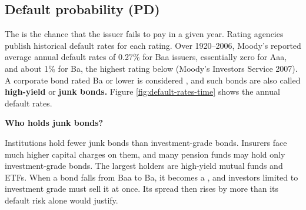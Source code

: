 \subsection{Default probability (PD)}

The  is the chance that the issuer fails to pay in a given year. Rating agencies publish historical default rates for each rating. Over 1920--2006, Moody's reported average annual default rates of 0.27\% 
for Baa issuers, essentially zero for Aaa, and about 1\% for Ba, 
the highest rating below  (Moody's Investors Service 2007). A corporate bond rated Ba or lower is considered , and such bonds are also called \textbf{high-yield} or \textbf{junk bonds.} Figure \ref{fig:default-rates-time} shows the annual default rates.

\begin{callout}{\textbf{Who holds junk bonds?}}

Institutions hold fewer junk bonds than investment-grade bonds. Insurers face much higher capital charges on them, and many pension funds may hold only investment-grade bonds. The largest holders are high-yield mutual funds and ETFs. When a bond falls from Baa to Ba, it becomes a , and investors limited to investment grade must sell it at once. Its spread then rises by more than its default risk alone would justify.
\end{callout}

